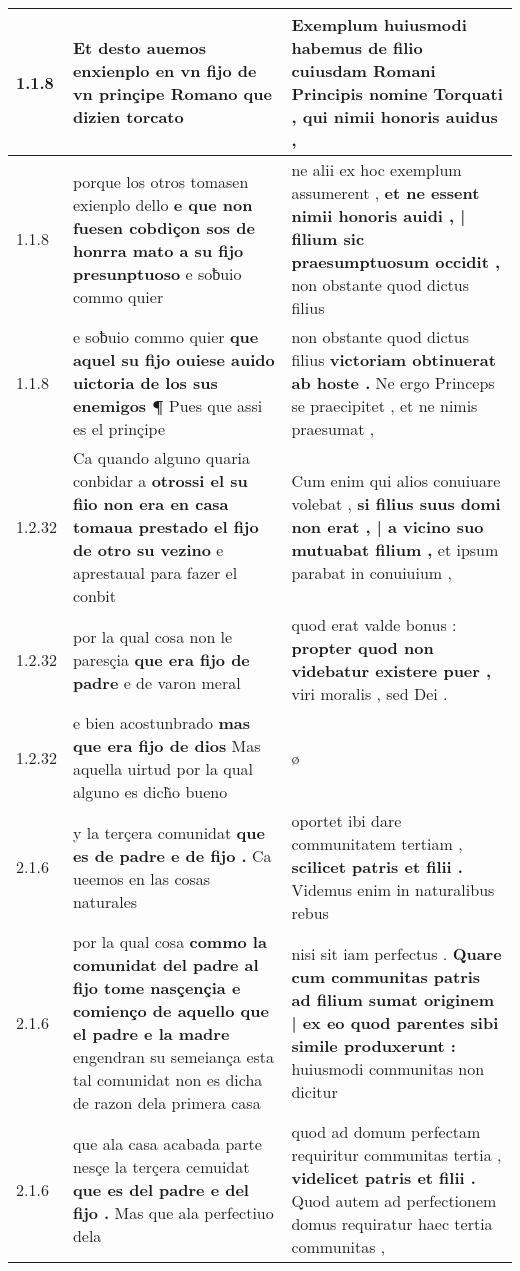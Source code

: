 \begin{tabular}{|p{1cm}|p{6.5cm}|p{6.5cm}|}

\hline
1.1.8 & Et desto auemos \textbf{ enxienplo en vn fijo de vn prinçipe Romano } que dizien torcato & Exemplum huiusmodi habemus \textbf{ de filio cuiusdam Romani Principis nomine Torquati , } qui nimii honoris auidus , \\\hline
1.1.8 & porque los otros tomasen exienplo dello \textbf{ e que non fuesen cobdiçon sos de honrra mato a su fijo presunptuoso } e soƀuio commo quier & ne alii ex hoc exemplum assumerent , \textbf{ et ne essent nimii honoris auidi , | filium sic praesumptuosum occidit , } non obstante quod dictus filius \\\hline
1.1.8 & e soƀuio commo quier \textbf{ que aquel su fijo ouiese auido uictoria de los sus enemigos ¶ } Pues que assi es el prinçipe & non obstante quod dictus filius \textbf{ victoriam obtinuerat ab hoste . } Ne ergo Princeps se praecipitet , et ne nimis praesumat , \\\hline
1.2.32 & Ca quando alguno quaria conbidar a \textbf{ otrossi el su fiio non era en casa tomaua prestado el fijo de otro su vezino } e aprestaual para fazer el conbit & Cum enim qui alios conuiuare volebat , \textbf{ si filius suus domi non erat , | a vicino suo mutuabat filium , } et ipsum parabat in conuiuium , \\\hline
1.2.32 & por la qual cosa non le paresçia \textbf{ que era fijo de padre } e de varon meral & quod erat valde bonus : \textbf{ propter quod non videbatur existere puer , } viri moralis , sed Dei . \\\hline
1.2.32 & e bien acostunbrado \textbf{ mas que era fijo de dios } Mas aquella uirtud por la qual alguno es dich̃o bueno & ø \\\hline
2.1.6 & y la terçera comunidat \textbf{ que es de padre e de fijo . } Ca ueemos en las cosas naturales & oportet ibi dare communitatem tertiam , \textbf{ scilicet patris et filii . } Videmus enim in naturalibus rebus \\\hline
2.1.6 & por la qual cosa \textbf{ commo la comunidat del padre al fijo tome nasçençia e comienço de aquello que el padre e la madre } engendran su semeiança esta tal comunidat non es dicha de razon dela primera casa & nisi sit iam perfectus . \textbf{ Quare cum communitas patris ad filium sumat originem | ex eo quod parentes sibi simile produxerunt : } huiusmodi communitas non dicitur \\\hline
2.1.6 & que ala casa acabada parte nesçe la terçera cemuidat \textbf{ que es del padre e del fijo . } Mas que ala perfectiuo dela & quod ad domum perfectam requiritur communitas tertia , \textbf{ videlicet patris et filii . } Quod autem ad perfectionem domus requiratur haec tertia communitas , \\\hline

\end{tabular}
